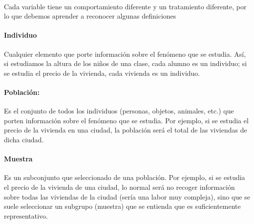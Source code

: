 \documentclass[12pt,hidelinks]{article}
\begin{document}
	\paragraph{} Cada variable tiene un comportamiento diferente y un tratamiento diferente, por lo que debemos aprender a reconocer algunas definiciones
	\paragraph{Individuo} Cualquier elemento que porte información sobre el fenómeno que se estudia. Así, si estudiamos la altura de los niños de una clase, cada alumno es un individuo; si se estudia el precio	de la vivienda, cada vivienda es un individuo.
	\paragraph{Población:} Es el conjunto de todos los individuos (personas, objetos, animales, etc.) que porten información sobre el fenómeno que se estudia. Por ejemplo, si se estudia el precio de la vivienda en una ciudad, la población será el total de las viviendas de dicha ciudad.
	\paragraph{Muestra} Es un subconjunto que seleccionado de una población. Por ejemplo, si se estudia el precio de la vivienda de una ciudad, lo normal será no recoger información sobre todas las viviendas de la ciudad (sería una labor muy compleja), sino que se suele seleccionar un subgrupo (muestra) que se entienda que es suficientemente representativo.
\end{document}

